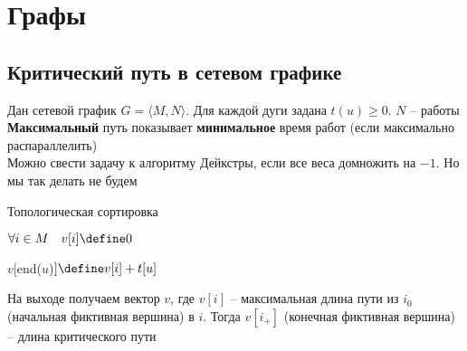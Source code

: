 \chapter{Графы}

\section{Критический путь в сетевом графике}

Дан сетевой график $ G = \langle M, N \rangle $. Для каждой дуги задана $ t(u) \ge 0 $. $ N $ -- работы \\
\textbf{Максимальный} путь показывает \textbf{минимальное} время работ (если максимально распараллелить) \\
Можно свести задачу к алгоритму Дейкстры, если все веса домножить на $ -1 $. Но мы так делать не будем

\begin{algo}
	\item Топологическая сортировка
    \item $ \forall i \in M \quad v[i] \define 0 $
    \item
    \begin{algorithm2e}[H]
        {
            {
                {$ v[ $end($ u $)$ ] \define v[i] + t[u] $}}}
    \end{algorithm2e}
    На выходе получаем вектор $ v $, где $ v[i] $ -- максимальная длина пути из $ i_0 $ (начальная фиктивная вершина) в $ i $. Тогда $ v[i_+] $ (конечная фиктивная вершина) -- длина критического пути
\end{algo}

